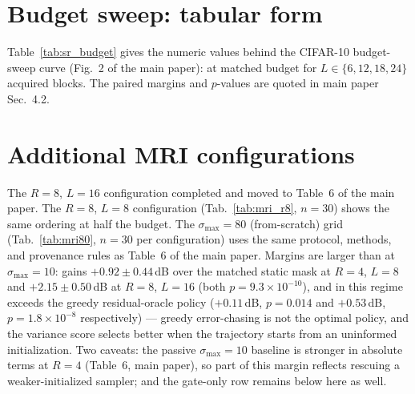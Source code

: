 \documentclass[10pt,twocolumn,letterpaper]{article}
\begin{document}
\section{Budget sweep: tabular form}\label{sec:supp_budget}

Table~\ref{tab:sr_budget} gives the numeric values behind the CIFAR-10
budget-sweep curve (Fig.~2 of the main paper): \psnrm{} at matched
budget for $L \in \{6, 12, 18, 24\}$ acquired blocks. The paired
margins and $p$-values are quoted in main paper Sec.~4.2.


\section{Additional MRI configurations}\label{sec:supp_pending}

The $R{=}8$, $L{=}16$ configuration completed and moved to Table~6 of
the main paper. The $R{=}8$, $L{=}8$ configuration
(Tab.~\ref{tab:mri_r8}, $n{=}30$)\RLOCAL{} shows the same ordering at
half the budget. The $\sigma_{\max}{=}80$ (from-scratch) grid
(Tab.~\ref{tab:mri80}, $n{=}30$ per configuration)\RLOCAL{} uses the
same protocol, methods, and provenance rules as Table~6 of the main
paper. Margins are larger than at $\sigma_{\max}{=}10$: \pvas{} gains
$+0.92\pm0.44$\,dB over the matched static mask at $R{=}4$, $L{=}8$ and
$+2.15\pm0.50$\,dB at $R{=}8$, $L{=}16$ (both
$p{=}9.3{\times}10^{-10}$), and in this regime exceeds the greedy
residual-oracle policy ($+0.11$\,dB, $p{=}0.014$ and $+0.53$\,dB,
$p{=}1.8{\times}10^{-8}$ respectively) --- greedy error-chasing is not
the optimal policy, and the variance score selects better when the
trajectory starts from an uninformed initialization. Two caveats: the
passive $\sigma_{\max}{=}10$ baseline is stronger in absolute terms at
$R{=}4$ (Table~6, main paper), so part of this margin reflects
rescuing a weaker-initialized sampler; and the gate-only row remains
below \pigdm{} here as well.

\end{document}
